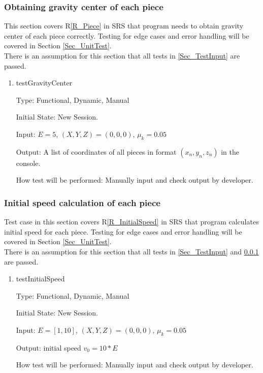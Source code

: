 \documentclass[12pt, titlepage]{article}
\newcommand{\rref}[1]{R\ref{#1}}
\begin{document}
\subsubsection{Obtaining gravity center of each piece}
\label{Sec_testGravityCenter}

This section covers \rref{R_Piece} in SRS that program needs to obtain gravity center of each piece correctly. Testing for edge cases and error handling will be covered in Section \ref{Sec_UnitTest}. \\
There is an assumption for this section that all tests in \ref{Sec_TestInput} are passed.

\begin{enumerate}

\item{testGravityCenter\\}

Type: Functional, Dynamic, Manual

Initial State: New Session.

Input: $E = 5$, $(X,Y,Z) = (0,0,0)$, $\mu_{k} = 0.05$  

Output: A list of coordinates of all pieces in format $(x_{n},y_{n},z_{n})$ in the console.

How test will be performed: Manually input and check output by developer.

\end{enumerate}


\subsubsection{Initial speed calculation of each piece}
\label{Sec_TestForInitialSpeed}

Test case in this section covers \rref{R_InitialSpeed} in SRS that program calculates initial speed for each piece. Testing for edge cases and error handling will be covered in Section \ref{Sec_UnitTest}.\\
There is an assumption for this section that all tests in \ref{Sec_TestInput} and \ref{Sec_testGravityCenter} are passed.
\begin{enumerate}

\item{testInitialSpeed\\}

Type: Functional, Dynamic, Manual

Initial State: New Session.

Input: $E = [1,10]$, $(X,Y,Z) = (0,0,0)$, $\mu_{k} = 0.05$  

Output: initial speed $v_{0} = 10 * E$  

How test will be performed: Manually input and check output by developer.

\end{enumerate}
\end{document}
